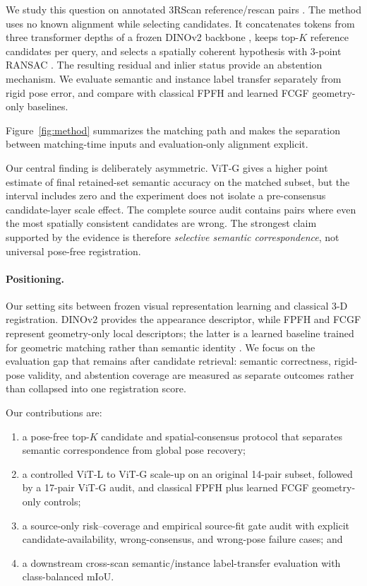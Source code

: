\documentclass[10pt,twocolumn]{article}
\begin{document}
We study this question on annotated 3RScan reference/rescan pairs
\cite{3rscan}. The method uses no known alignment while selecting candidates.
It concatenates tokens from three transformer depths of a frozen DINOv2
backbone \cite{dinov2}, keeps top-$K$ reference candidates per query, and
selects a spatially coherent hypothesis with 3-point RANSAC
\cite{ransac}. The resulting
residual and inlier status provide an abstention mechanism. We evaluate semantic
and instance label transfer separately from rigid pose error, and compare with
classical FPFH \cite{fpfh} and learned FCGF \cite{fcgf} geometry-only
baselines.

Figure~\ref{fig:method} summarizes the matching path and makes the separation
between matching-time inputs and evaluation-only alignment explicit.

Our central finding is deliberately asymmetric. ViT-G gives a higher
point estimate of final retained-set semantic accuracy on the matched subset,
but the interval includes zero and the experiment does not isolate a
pre-consensus candidate-layer scale effect. The complete source
audit contains pairs where even the most spatially consistent candidates are
wrong. The strongest
claim supported by the evidence is therefore \emph{selective semantic
correspondence}, not universal pose-free registration.

\paragraph{Positioning.}
Our setting sits between frozen visual representation learning and classical
3-D registration. DINOv2 provides the appearance descriptor, while FPFH and
FCGF represent geometry-only local descriptors; the latter is a learned
baseline trained for geometric matching rather than semantic identity
\cite{fpfh,fcgf}. We focus on the evaluation gap that remains after candidate
retrieval: semantic correctness, rigid-pose validity, and abstention coverage
are measured as separate outcomes rather than collapsed into one registration
score.

Our contributions are:
\begin{enumerate}[leftmargin=1.5em,itemsep=1pt]
  \item a pose-free top-$K$ candidate and spatial-consensus protocol that
  separates semantic correspondence from global pose recovery;
  \item a controlled ViT-L to ViT-G scale-up on an original 14-pair subset,
  followed by a 17-pair ViT-G audit, and classical FPFH plus learned FCGF
  geometry-only controls;
  \item a source-only risk--coverage and empirical source-fit gate audit with explicit
  candidate-availability, wrong-consensus, and wrong-pose failure cases; and
  \item a downstream cross-scan semantic/instance label-transfer evaluation
  with class-balanced mIoU.
\end{enumerate}
\end{document}
